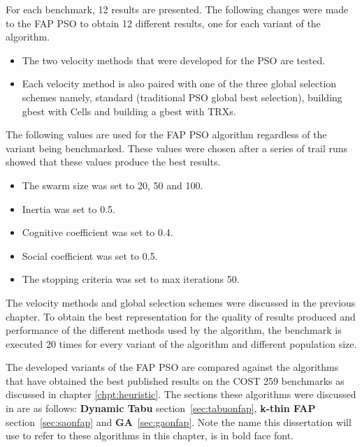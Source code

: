 For each benchmark, 12 results are presented. The following changes were made to the FAP PSO to obtain 12 different results, one for each variant of the algorithm.
\begin{itemize}
\item The two velocity methods that were developed for the PSO are tested.
\item Each velocity method is also paired with one of the three global selection schemes namely, standard (traditional PSO global best selection), building gbest with Cells and building a gbest with TRXs.
\end{itemize}
The following values are used for the FAP PSO algorithm regardless of the variant being benchmarked. These values were chosen after a series of trail runs showed that these values produce the best results.
\begin{itemize}
\item The swarm size was set to 20, 50 and 100.
\item Inertia was set to 0.5.
\item Cognitive coefficient was set to 0.4.
\item Social coefficient was set to 0.5.
\item The stopping criteria was set to max iterations 50.
\end{itemize}
The velocity methods and global selection schemes were discussed in the previous chapter. To obtain the best representation for the quality of results produced and performance of the different methods used by the algorithm, the benchmark is executed 20 times for every variant of the algorithm and different population size. 

The developed variants of the FAP PSO are compared against the algorithms that have obtained the best published results on the \gls{COST} 259 benchmarks as discussed in chapter \ref{chpt:heuristic}. The sections these algorithms were discussed in are as follows: \textbf{Dynamic Tabu} section~\ref{sec:tabuonfap}, \textbf{k-thin FAP} section~\ref{sec:saonfap} and \textbf{GA}~\ref{sec:gaonfap}. Note the name this dissertation will use to refer to these algorithms in this chapter, is in bold face font.

